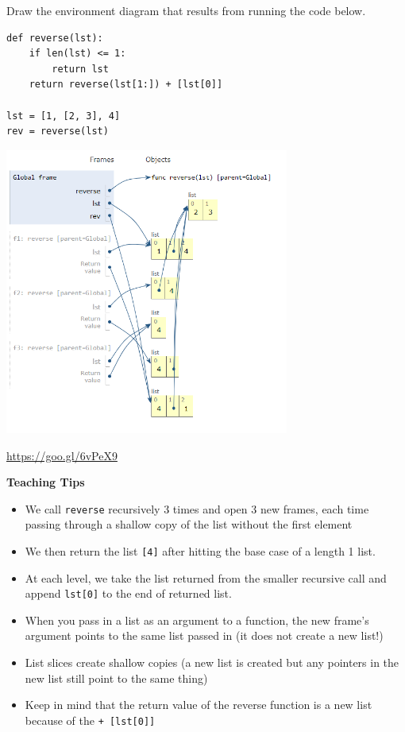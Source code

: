 \begin{blocksection}
\question Draw the environment diagram that results from running the code below.

\begin{lstlisting}
def reverse(lst):
    if len(lst) <= 1:
        return lst
    return reverse(lst[1:]) + [lst[0]]

lst = [1, [2, 3], 4]
rev = reverse(lst)
\end{lstlisting}

\begin{solution}[4in]
\includegraphics[width=0.7\textwidth]{reverse.png}

\url{https://goo.gl/6vPeX9}
\end{solution}
\end{blocksection}

\begin{questionmeta}
\textbf{Teaching Tips}
\begin{itemize}
    \item We call \lstinline{reverse} recursively 3 times and open 3 new frames, each time passing through a shallow copy of the list without the first element
    \item We then return the list \lstinline{[4]} after hitting the base case of a length 1 list.
    \item At each level, we take the list returned from the smaller recursive call and append \lstinline{lst[0]} to the end of returned list.
    \item When you pass in a list as an argument to a function, the new frame’s argument points to the same list passed in (it does not create a new list!)
    \item List slices create shallow copies (a new list is created but any pointers in the new list still point to the same thing)
    \item Keep in mind that the return value of the reverse function is a new list because of the \lstinline{+ [lst[0]]}
\end{itemize}
\end{questionmeta}
